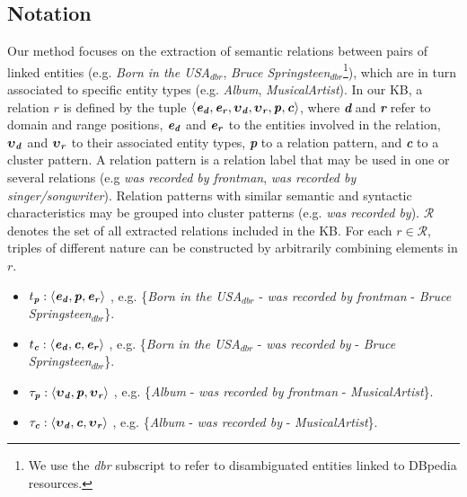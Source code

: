 \subsection{Notation}

Our method focuses on the extraction of semantic relations between pairs of linked entities (e.g. \textit{Born in the USA}$_{dbr}$, \textit{Bruce Springsteen}$_{dbr}$\footnote{We use the \textit{dbr} subscript to refer to disambiguated entities linked to DBpedia resources.}), which are in turn associated to specific entity types (e.g. \textit{Album}, \textit{MusicalArtist}). In our KB, a relation $r$ is defined by the tuple $\langle \textbf{\textit{e}}{_\textbf{\textit{d}}},
\textbf{\textit{e}}{_\textbf{\textit{r}}},
\boldsymbol\upsilon{_\textbf{\textit{d}}},
\boldsymbol\upsilon{_\textbf{\textit{r}}},
\textbf{\textit{p}}, \textbf{\textit{c}}\rangle$, where \textbf{\textit{d}} and \textbf{\textit{r}} refer to domain and range positions, $\textbf{\textit{e}}{_\textbf{\textit{d}}}$ and $\textbf{\textit{e}}{_\textbf{\textit{r}}}$ to the entities involved in the relation, $\boldsymbol\upsilon{_\textbf{\textit{d}}}$ and
$\boldsymbol\upsilon{_\textbf{\textit{r}}}$ to their associated entity types, \textbf{\textit{p}} to a relation pattern, and \textbf{\textit{c}} to a cluster pattern.  
A relation pattern is a relation label that may be used in one or several relations (e.g \textit{was recorded by frontman}, \textit{was recorded by singer/songwriter}). Relation patterns with similar semantic and syntactic characteristics may be grouped into cluster patterns (e.g. \textit{was recorded by}). 
$\mathcal{R}$ denotes the set of all extracted relations included in the KB.
For each $r \in \mathcal{R}$, triples of different nature can be constructed by arbitrarily combining elements in $r$.

\begin{itemize}
    \item $t_\textbf{\textit{p}}: \langle \textbf{\textit{e}}{_\textbf{\textit{d}}},\textbf{\textit{p}},\textbf{\textit{e}}{_\textbf{\textit{r}}} \rangle$ , e.g. \{\textit{Born in the USA}$_{dbr}$ - \textit{was recorded by frontman} - \textit{Bruce Springsteen}$_{dbr}$\}.
    \item $t_\textbf{\textit{c}}: \langle \textbf{\textit{e}}{_\textbf{\textit{d}}},\textbf{\textit{c}},\textbf{\textit{e}}{_\textbf{\textit{r}}} \rangle$ , e.g. \{\textit{Born in the USA}$_{dbr}$ - \textit{was recorded by} - \textit{Bruce Springsteen}$_{dbr}$\}.
    \item $\tau_\textbf{\textit{p}}: \langle \boldsymbol\upsilon{_\textbf{\textit{d}}},\textbf{\textit{p}},\boldsymbol\upsilon{_\textbf{\textit{r}}} \rangle$ , e.g. \{\textit{Album} - \textit{was recorded by frontman} - \textit{MusicalArtist}\}.
    \item $\tau_\textbf{\textit{c}}: \langle \boldsymbol\upsilon{_\textbf{\textit{d}}},\textbf{\textit{c}},\boldsymbol\upsilon{_\textbf{\textit{r}}} \rangle$ , e.g. \{\textit{Album} - \textit{was recorded by} - \textit{MusicalArtist}\}.
\end{itemize}

